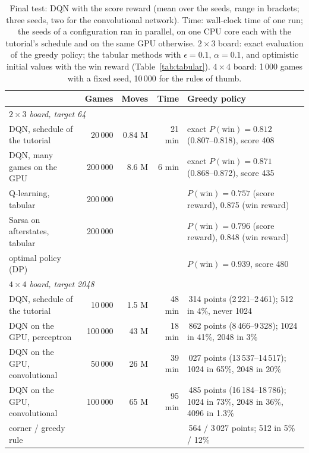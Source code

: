 \documentclass[11pt,a4paper]{article}
\theoremstyle{remark}
\begin{document}
\begin{table}[ht]
\centering\small
\begin{tabularx}{\linewidth}{lrrr>{\raggedright\arraybackslash}X}
\toprule
 & Games & Moves & Time & Greedy policy\\
\midrule
\multicolumn{5}{l}{\emph{$2\times3$ board, target 64}}\\
DQN, schedule of the tutorial & 20\,000 & 0.84 M & 21 min & exact $P(\text{win})=0.812$ (0.807--0.818), score 408\\
DQN, many games on the GPU & 200\,000 & 8.6 M & 6 min & exact $P(\text{win})=0.871$ (0.868--0.872), score 435\\
Q-learning, tabular & 200\,000 & & & $P(\text{win})=0.757$ (score reward), 0.875 (win reward)\\
Sarsa on afterstates, tabular & 200\,000 & & & $P(\text{win})=0.796$ (score reward), 0.848 (win reward)\\
optimal policy (DP) & & & & $P(\text{win})=0.939$, score 480\\
\midrule
\multicolumn{5}{l}{\emph{$4\times4$ board, target 2048}}\\
DQN, schedule of the tutorial & 10\,000 & 1.5 M & 48 min & 2\,314 points (2\,221--2\,461); 512 in 4\%, never 1024\\
DQN on the GPU, perceptron & 100\,000 & 43 M & 18 min & 8\,862 points (8\,466--9\,328); 1024 in 41\%, 2048 in 3\%\\
DQN on the GPU, convolutional & 50\,000 & 26 M & 39 min & 14\,027 points (13\,537--14\,517); 1024 in 65\%, 2048 in 20\%\\
DQN on the GPU, convolutional & 100\,000 & 65 M & 95 min & 17\,485 points (16\,184--18\,786); 1024 in 73\%, 2048 in 36\%, 4096 in 1.3\%\\
corner / greedy rule & & & & 2\,564 / 3\,027 points; 512 in 5\% / 12\%\\
\bottomrule
\end{tabularx}
\caption{Final test: DQN with the score reward (mean over the seeds, range in brackets; three seeds, two for the convolutional network). Time: wall-clock time of one run; the seeds of a configuration ran in parallel, on one CPU core each with the tutorial's schedule and on the same GPU otherwise. $2\times3$ board: exact evaluation of the greedy policy; the tabular methods with $\epsilon=0.1$, $\alpha=0.1$, and optimistic initial values with the win reward (Table~\ref{tab:tabular}). $4\times4$ board: 1\,000 games with a fixed seed, 10\,000 for the rules of thumb.}
\label{tab:dqn}
\end{table}
\end{document}
